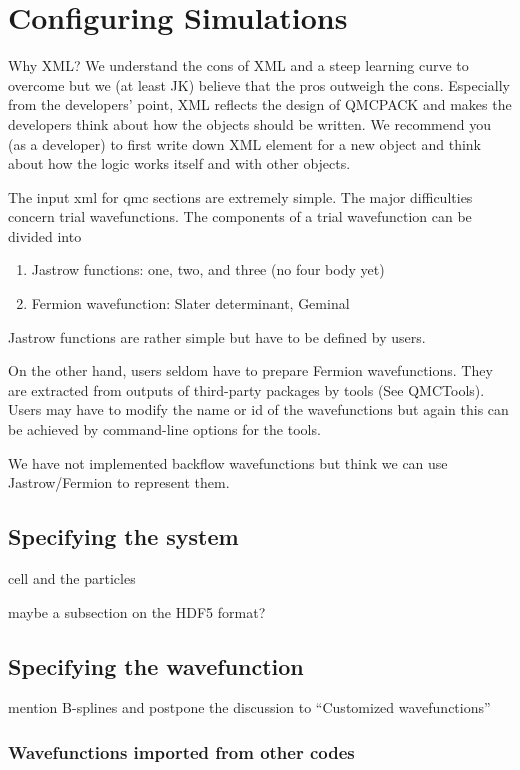 \chapter{Configuring Simulations}
Why XML? We understand the cons of XML and a steep learning curve to overcome but we (at least JK) believe that the pros outweigh the cons. Especially from the developers' point, XML reflects the design of QMCPACK and makes the developers think about how the objects should be written. We recommend you (as a developer) to first write down XML element for a new object and think about how the logic works itself and with other objects. 

The input xml for qmc sections are extremely simple. The major difficulties concern trial wavefunctions. The components of a trial wavefunction can be divided into
\begin{enumerate}
\item{} Jastrow functions: one, two, and three (no four body yet)
\item{} Fermion wavefunction: Slater determinant, Geminal 
\end{enumerate}

Jastrow functions are rather simple but have to be defined by users.

On the other hand, users seldom have to prepare Fermion wavefunctions. They are extracted from outputs of third-party packages by tools (See QMCTools). Users may have to modify the name or id of the wavefunctions but again this can be achieved by command-line options for the tools.

We have not implemented backflow wavefunctions but think we can use Jastrow/Fermion to represent them. 

\section{Specifying the system}
cell and the particles

maybe a subsection on the HDF5 format?
\section{Specifying the wavefunction}
mention B-splines and postpone the discussion to ``Customized wavefunctions''
\subsection{Wavefunctions imported from other codes}
